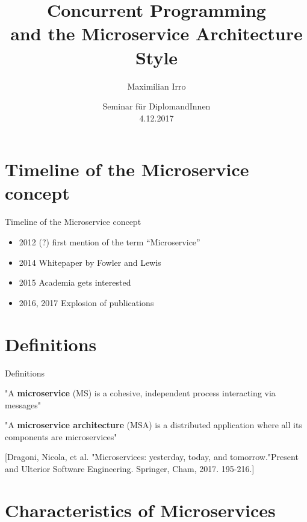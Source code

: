 \documentclass{beamer}
\title[Your Short Title]{Concurrent Programming\\and the Microservice Architecture Style}
\author{Maximilian Irro}
\date{Seminar für DiplomandInnen\\4.12.2017}
\begin{document}
\begin{frame}
  \titlepage
\end{frame}


\section{Timeline of the Microservice concept}

\begin{frame}{Timeline of the Microservice concept}

\begin{itemize}
  \item 2012 (?) first mention of the term “Microservice”
  \item 2014 Whitepaper by Fowler and Lewis
  \item 2015 Academia gets interested
  \item 2016, 2017 Explosion of publications
\end{itemize}

\end{frame}

\section{Definitions}

\begin{frame}{Definitions}

\pause

"A \textbf{microservice} (MS) is a cohesive, independent process interacting via messages"

\pause
\vskip 1cm

"A \textbf{microservice architecture} (MSA) is a distributed application where all its components are microservices"

\vskip 2cm

\tiny{[Dragoni, Nicola, et al. "Microservices: yesterday, today, and tomorrow."Present and Ulterior Software Engineering. Springer, Cham, 2017. 195-216.]}

\end{frame}

\section{Characteristics of Microservices}
\end{document}
